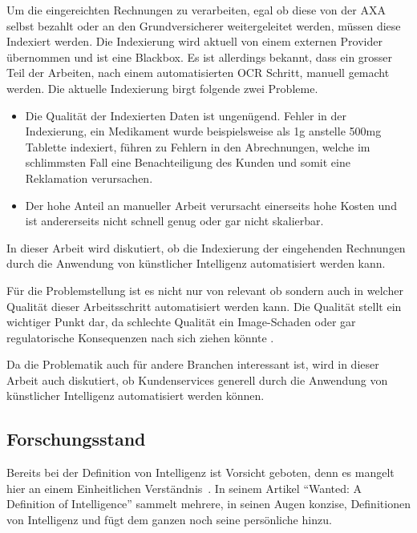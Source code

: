 \documentclass{hwz}
\begin{document}

Um die eingereichten Rechnungen zu verarbeiten, egal ob diese von der AXA selbst bezahlt oder an den Grundversicherer weitergeleitet werden, müssen diese Indexiert werden. Die Indexierung wird aktuell von einem externen Provider übernommen und ist eine Blackbox. Es ist allerdings bekannt, dass ein grosser Teil der Arbeiten, nach einem automatisierten OCR Schritt, manuell gemacht werden. Die aktuelle Indexierung birgt folgende zwei Probleme. 

\begin{itemize}
    \item Die Qualität der Indexierten Daten ist ungenügend. Fehler in der Indexierung, ein Medikament wurde beispielsweise als 1g anstelle 500mg Tablette indexiert, führen zu Fehlern in den Abrechnungen, welche im schlimmsten Fall eine Benachteiligung des Kunden und somit eine Reklamation verursachen. 
    \item Der hohe Anteil an manueller Arbeit verursacht einerseits hohe Kosten und ist andererseits nicht schnell genug oder gar nicht skalierbar.
\end{itemize}

In dieser Arbeit wird diskutiert, ob die Indexierung der eingehenden Rechnungen durch die Anwendung von künstlicher Intelligenz automatisiert werden kann.

Für die Problemstellung ist es nicht nur von relevant ob sondern auch in welcher Qualität dieser Arbeitsschritt automatisiert werden kann. Die Qualität stellt ein wichtiger Punkt dar, da schlechte Qualität ein Image-Schaden oder gar regulatorische Konsequenzen nach sich ziehen könnte .

Da die Problematik auch für andere Branchen interessant ist, wird in dieser Arbeit auch diskutiert, ob Kundenservices generell durch die Anwendung von künstlicher Intelligenz automatisiert werden können.

\subsection{Forschungsstand}


Bereits bei der Definition von Intelligenz ist Vorsicht geboten, denn es mangelt hier an einem Einheitlichen Verständnis~\autocite{Warner2002Wanted:Intelligence}. In seinem Artikel \enquote{Wanted: A Definition of Intelligence} sammelt \textcite{Warner2002Wanted:Intelligence}  mehrere, in seinen Augen konzise, Definitionen von Intelligenz und fügt dem ganzen noch seine persönliche hinzu.
\end{document}
